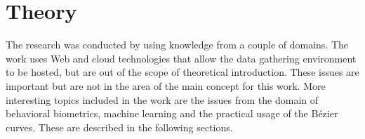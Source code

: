 \chapter{Theory}\label{ch:theory}
The research was conducted by using knowledge from a couple of domains.
The work uses Web and cloud technologies that allow the data gathering environment to be hosted, but are out of the scope of theoretical introduction.
These issues are important but are not in the area of the main concept for this work.
More interesting topics included in the work are the issues from the domain of behavioral biometrics, machine learning and the practical usage of the Bézier curves.
These are described in the following sections.
